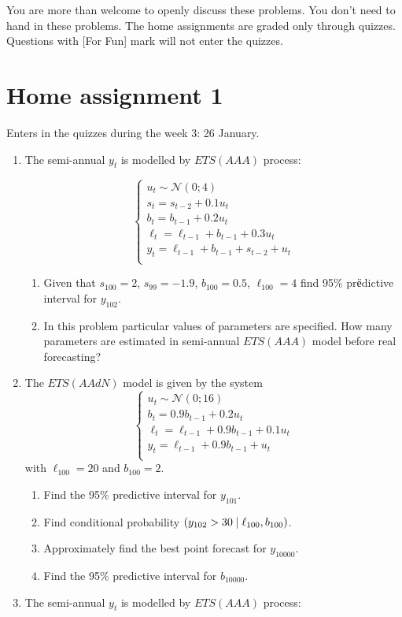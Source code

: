 \documentclass[12pt]{article}
\let\P\relax
\DeclareMathOperator{\P}{\mathbb{P}}
\newcommand{\cN}{\mathcal{N}}
\begin{document}
You are more than welcome to openly discuss these problems. 
You don't need to hand in these problems.
The home assignments are graded only through quizzes. 
Questions with [For Fun] mark will not enter the quizzes. 

\section*{Home assignment 1}

Enters in the quizzes during the week 3: 26 January. 

\begin{enumerate}
\item   The semi-annual $y_t$ is modelled by $ETS(AAA)$ process:
    
    \[
    \begin{cases}
        u_t \sim \cN(0; 4) \\
        s_t = s_{t-2} + 0.1 u_t \\
        b_t = b_{t-1} + 0.2 u_t \\
        \ell_t = \ell_{t-1} + b_{t-1} + 0.3 u_t \\
        y_t = \ell_{t-1} + b_{t-1} + s_{t-2} + u_t \\
    \end{cases}    
    \]

    \begin{enumerate}
        \item Given that $s_{100} = 2$, $s_{99} = -1.9$, $b_{100} = 0.5$, $\ell_{100} = 4$ find 95\% prёdictive interval for $y_{102}$. 
        \item In this problem particular values of parameters are specified. 
        How many parameters are estimated in semi-annual $ETS(AAA)$ model before real forecasting?
    \end{enumerate}
\item   The $ETS(AAdN)$ model is given by the system
  \[
  \begin{cases}
  u_t  \sim \cN(0; 16) \\
  b_t = 0.9 b_{t-1} + 0.2 u_t \\
  \ell_t = \ell_{t-1} + 0.9 b_{t-1} + 0.1 u_t \\
  y_t = \ell_{t-1} + 0.9 b_{t-1} + u_t \\
  \end{cases}
  \]
  with $\ell_{100} = 20$ and $b_{100} = 2$.
\begin{enumerate}
  \item Find the 95\% predictive interval for $y_{101}$.
  \item Find conditional probability $\P(y_{102} > 30 \mid \ell_{100}, b_{100})$.
  \item Approximately find the best point forecast for $y_{10000}$.
  \item Find the 95\% predictive interval for $b_{10000}$.
\end{enumerate}
\item The semi-annual $y_t$ is modelled by $ETS(AAA)$ process:
    

\end{enumerate}
\end{document}
